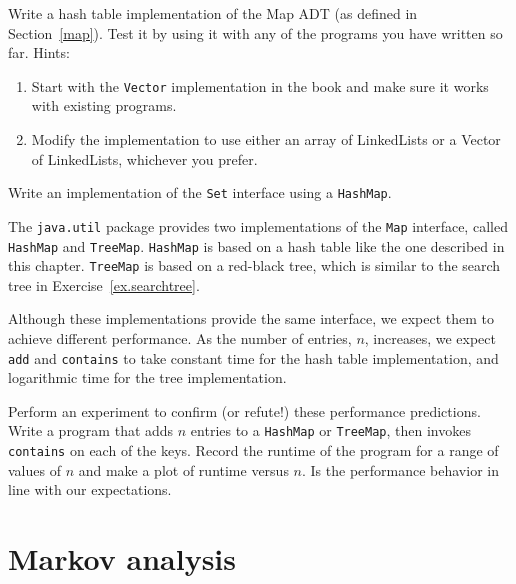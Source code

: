 \begin{exercise}
Write a hash table implementation of the Map ADT (as defined in
Section~\ref{map}).  Test it by using it with any of the programs
you have written so far.  Hints:

\begin{enumerate}

\item Start with the {\tt Vector} implementation in the book
and make sure it works with existing programs.

\item Modify the implementation to use either an array of
LinkedLists or a Vector of LinkedLists, whichever you prefer.

\end{enumerate}
\end{exercise}


\begin{exercise}
Write an implementation of the {\tt Set} interface using a
{\tt HashMap}.
\end {exercise}


\begin{exercise}

The {\tt java.util} package provides two implementations of the
{\tt Map} interface, called {\tt HashMap} and {\tt TreeMap}.
{\tt HashMap} is based on a hash table like the one described
in this chapter.  {\tt TreeMap} is based on a red-black tree, which
is similar to the search tree in Exercise~\ref{ex.searchtree}.

Although these implementations provide the same interface, we
expect them to achieve different performance.  As the number of
entries, $n$, increases, we expect {\tt add} and {\tt contains}
to take constant time for the hash table implementation, and
logarithmic time for the tree implementation.

Perform an experiment to confirm (or refute!) these performance
predictions.  Write a program that adds $n$ entries to a 
{\tt HashMap} or {\tt TreeMap}, then invokes {\tt contains} on
each of the keys.  Record the runtime of the program for a range
of values of $n$ and make a plot of runtime versus $n$.  Is
the performance behavior in line with our expectations.
\end {exercise}


\chapter{Markov analysis}
\label{markov}

